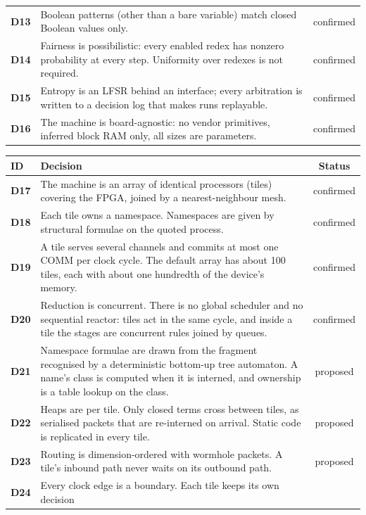 \documentclass[10.5pt,a4paper]{extarticle}
\newcommand{\dec}[1]{\textbf{D#1}}
\newcommand{\conf}{confirmed}
\newcommand{\prop}{proposed}
\theoremstyle{definition}
\theoremstyle{remark}
\begin{document}
\begin{tabularx}{\textwidth}{@{}l X c@{}}
\dec{13} & Boolean patterns (other than a bare variable) match closed Boolean
          values only. & \conf\\
\dec{14} & Fairness is possibilistic: every enabled redex has nonzero
          probability at every step. Uniformity over redexes is not required. & \conf\\
\dec{15} & Entropy is an LFSR behind an interface; every arbitration is
          written to a decision log that makes runs replayable. & \conf\\
\dec{16} & The machine is board-agnostic: no vendor primitives, inferred
          block RAM only, all sizes are parameters. & \conf\\
\bottomrule
\end{tabularx}

\medskip\noindent
\begin{tabularx}{\textwidth}{@{}l X c@{}}
\toprule
ID & Decision & Status\\
\midrule
\dec{17} & The machine is an array of identical processors (tiles) covering
          the FPGA, joined by a nearest-neighbour mesh. & \conf\\
\dec{18} & Each tile owns a namespace. Namespaces are given by structural
          formulae on the quoted process. & \conf\\
\dec{19} & A tile serves several channels and commits at most one COMM per
          clock cycle. The default array has about 100 tiles, each with about
          one hundredth of the device's memory. & \conf\\
\dec{20} & Reduction is concurrent. There is no global scheduler and no
          sequential reactor: tiles act in the same cycle, and inside a tile
          the stages are concurrent rules joined by queues. & \conf\\
\dec{21} & Namespace formulae are drawn from the fragment recognised by a
          deterministic bottom-up tree automaton. A name's class is computed
          when it is interned, and ownership is a table lookup on the class. & \prop\\
\dec{22} & Heaps are per tile. Only closed terms cross between tiles, as
          serialised packets that are re-interned on arrival. Static code is
          replicated in every tile. & \prop\\
\dec{23} & Routing is dimension-ordered with wormhole packets. A tile's
          inbound path never waits on its outbound path. & \prop\\
\dec{24} & Every clock edge is a boundary. Each tile keeps its own decision

\end{tabularx}
\end{document}
